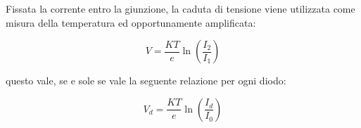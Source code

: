 Fissata la corrente entro la giunzione, la caduta di tensione viene
utilizzata come misura della temperatura ed opportunamente
amplificata:

	\[V=\frac{KT}{e}\ln(\frac{I_2}{I_1})\]

questo vale, se e sole se vale la seguente relazione per ogni diodo:

	\[V_d=\frac{KT}{e}\ln(\frac{I_d}{I_0})\]